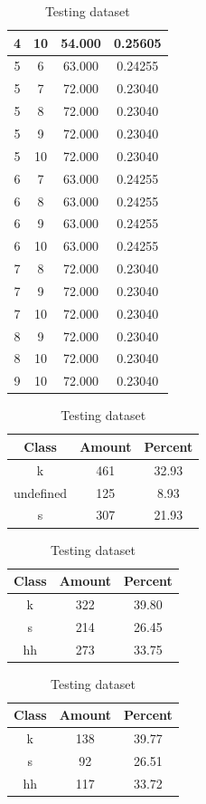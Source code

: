\begin{table}
\begin{subtable}[h]{0.45\textwidth}
{\begin{tabular}{|c|c|c|c|}
 4 & 10 & 54.000 & 0.25605\\ \hline 
 5 & 6 & 63.000 & 0.24255\\ \hline 
 5 & 7 & 72.000 & 0.23040\\ \hline 
 5 & 8 & 72.000 & 0.23040\\ \hline 
 5 & 9 & 72.000 & 0.23040\\ \hline 
 5 & 10 & 72.000 & 0.23040\\ \hline 
 6 & 7 & 63.000 & 0.24255\\ \hline 
 6 & 8 & 63.000 & 0.24255\\ \hline 
 6 & 9 & 63.000 & 0.24255\\ \hline 
 6 & 10 & 63.000 & 0.24255\\ \hline 
 7 & 8 & 72.000 & 0.23040\\ \hline 
 7 & 9 & 72.000 & 0.23040\\ \hline 
 7 & 10 & 72.000 & 0.23040\\ \hline 
 8 & 9 & 72.000 & 0.23040\\ \hline 
 8 & 10 & 72.000 & 0.23040\\ \hline 
 9 & 10 & 72.000 & 0.23040\\ \hline 

\end{tabular}
}\caption{xcscentroid2010}\label{xlscentroid2010}

\end{subtable}

\begin{subtable}[h]{0.45\textwidth}
\centering
\begin{tabular}{|c|c|c|}
\hline
Class & Amount & Percent\\ \hline
k & 461 & 32.93\\ \hline
undefined & 125 & 8.93\\ \hline
s & 307 & 21.93\\ \hline
\end{tabular}
\caption{Entire dataset after stripping short sounds}
\end{subtable}
\hfill
\begin{subtable}[h]{0.45\textwidth}
\centering
\begin{tabular}{|c|c|c|}
\hline
Class & Amount & Percent\\ \hline
k & 322 & 39.80\\ \hline
s & 214 & 26.45\\ \hline
hh & 273 & 33.75\\ \hline
\end{tabular}
\caption{Training dataset}
\end{subtable}
\hfill
\begin{subtable}[h]{0.45\textwidth}
\centering
\begin{tabular}{|c|c|c|}
\hline
Class & Amount & Percent\\ \hline
k & 138 & 39.77\\ \hline
s & 92 & 26.51\\ \hline
hh & 117 & 33.72\\ \hline
\end{tabular}
\caption{Testing dataset}
\end{subtable}
\hfill


\end{table}
